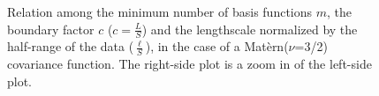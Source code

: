 \documentclass[onecolumn,a4paper,11pt]{article}
\begin{document}
\begin{figure}
\centering
{}
\hspace{3mm}
\caption{Relation among the minimum number of basis functions $m$, the boundary factor $c$ ($c = \frac{L}{S}$) and the lengthscale normalized by the half-range of the data ($\frac{\ell}{S}$), in the case of a Mat\`ern($\nu$=3/2) covariance function. The right-side plot is a zoom in of the left-side plot.}
  \label{fig6_lscale_vs_J_vs_c_Matern}
\end{figure}
\end{document}
